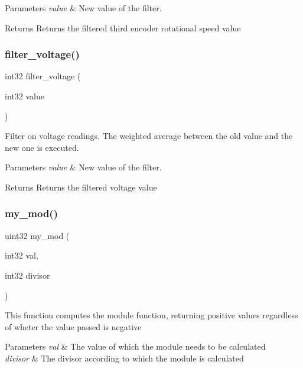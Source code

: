 \begin{DoxyParams}{Parameters}
{\em value} & New value of the filter.\\
\hline
\end{DoxyParams}
\begin{DoxyReturn}{Returns}
Returns the filtered third encoder rotational speed value 
\end{DoxyReturn}
\mbox{\label{utils_8c_ae34079960d1cb2d36ceb390569507710}} 
\subsubsection{filter\+\_\+voltage()}
{\footnotesize\ttfamily int32 filter\+\_\+voltage (\begin{DoxyParamCaption}\item[{int32}]{value }\end{DoxyParamCaption})}

Filter on voltage readings. The weighted average between the old value and the new one is executed.


\begin{DoxyParams}{Parameters}
{\em value} & New value of the filter.\\
\hline
\end{DoxyParams}
\begin{DoxyReturn}{Returns}
Returns the filtered voltage value 
\end{DoxyReturn}
\mbox{\label{utils_8c_a01d3bb6c1fd469a6c530fb296e4fe0fe}} 
\subsubsection{my\+\_\+mod()}
{\footnotesize\ttfamily uint32 my\+\_\+mod (\begin{DoxyParamCaption}\item[{int32}]{val,  }\item[{int32}]{divisor }\end{DoxyParamCaption})}

This function computes the module function, returning positive values regardless of wheter the value passed is negative


\begin{DoxyParams}{Parameters}
{\em val} & The value of which the module needs to be calculated \\
\hline
{\em divisor} & The divisor according to which the module is calculated \\
\hline
\end{DoxyParams}
\mbox{\label{utils_8c_a1ea4108a2c530470624ce2678e65dcef}} 
